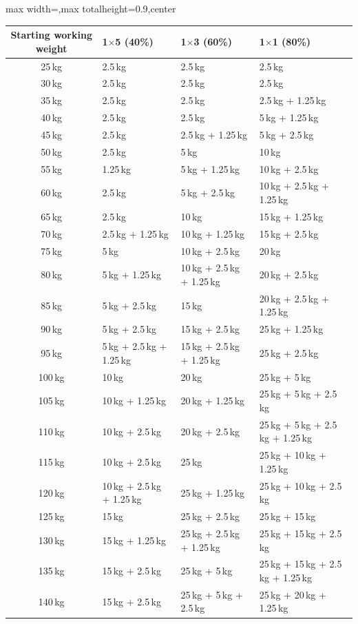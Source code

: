 \documentclass[11pt,a4paper]{article}
\newcommand{\tablearraystretch}{1.15}
\begin{document}
\begin{center}
\renewcommand{\arraystretch}{\tablearraystretch}
\begin{adjustbox}{max width=\linewidth,max totalheight=0.9\textheight,center}
\begin{tabular}{c p{4.3cm} p{4.3cm} p{4.3cm}}
\toprule
Starting working weight &
1$\times$5 (40\%) &
1$\times$3 (60\%) &
1$\times$1 (80\%) \\
\midrule
25\,kg   & 2.5\,kg & 2.5\,kg & 2.5\,kg \\
30\,kg   & 2.5\,kg & 2.5\,kg & 2.5\,kg \\
35\,kg   & 2.5\,kg & 2.5\,kg & 2.5\,kg + 1.25\,kg \\
40\,kg   & 2.5\,kg & 2.5\,kg & 5\,kg + 1.25\,kg \\
45\,kg   & 2.5\,kg & 2.5\,kg + 1.25\,kg & 5\,kg + 2.5\,kg \\
50\,kg   & 2.5\,kg & 5\,kg & 10\,kg \\
55\,kg   & 1.25\,kg & 5\,kg + 1.25\,kg & 10\,kg + 2.5\,kg \\
60\,kg   & 2.5\,kg & 5\,kg + 2.5\,kg & 10\,kg + 2.5\,kg + 1.25\,kg \\
65\,kg   & 2.5\,kg & 10\,kg & 15\,kg + 1.25\,kg \\
70\,kg   & 2.5\,kg + 1.25\,kg & 10\,kg + 1.25\,kg & 15\,kg + 2.5\,kg \\
75\,kg   & 5\,kg & 10\,kg + 2.5\,kg & 20\,kg \\
80\,kg   & 5\,kg + 1.25\,kg & 10\,kg + 2.5\,kg + 1.25\,kg & 20\,kg + 2.5\,kg \\
85\,kg   & 5\,kg + 2.5\,kg & 15\,kg & 20\,kg + 2.5\,kg + 1.25\,kg \\
90\,kg   & 5\,kg + 2.5\,kg & 15\,kg + 2.5\,kg & 25\,kg + 1.25\,kg \\
95\,kg   & 5\,kg + 2.5\,kg + 1.25\,kg & 15\,kg + 2.5\,kg + 1.25\,kg & 25\,kg + 2.5\,kg \\
100\,kg  & 10\,kg & 20\,kg & 25\,kg + 5\,kg \\
105\,kg  & 10\,kg + 1.25\,kg & 20\,kg + 1.25\,kg & 25\,kg + 5\,kg + 2.5\,kg \\
110\,kg  & 10\,kg + 2.5\,kg & 20\,kg + 2.5\,kg & 25\,kg + 5\,kg + 2.5\,kg + 1.25\,kg \\
115\,kg  & 10\,kg + 2.5\,kg & 25\,kg & 25\,kg + 10\,kg + 1.25\,kg \\
120\,kg  & 10\,kg + 2.5\,kg + 1.25\,kg & 25\,kg + 1.25\,kg & 25\,kg + 10\,kg + 2.5\,kg \\
125\,kg  & 15\,kg & 25\,kg + 2.5\,kg & 25\,kg + 15\,kg \\
130\,kg  & 15\,kg + 1.25\,kg & 25\,kg + 2.5\,kg + 1.25\,kg & 25\,kg + 15\,kg + 2.5\,kg \\
135\,kg  & 15\,kg + 2.5\,kg & 25\,kg + 5\,kg & 25\,kg + 15\,kg + 2.5\,kg + 1.25\,kg \\
140\,kg  & 15\,kg + 2.5\,kg & 25\,kg + 5\,kg + 2.5\,kg & 25\,kg + 20\,kg + 1.25\,kg \\
\bottomrule
\end{tabular}
\end{adjustbox}
\renewcommand{\arraystretch}{1}
\end{center}
\end{document}

